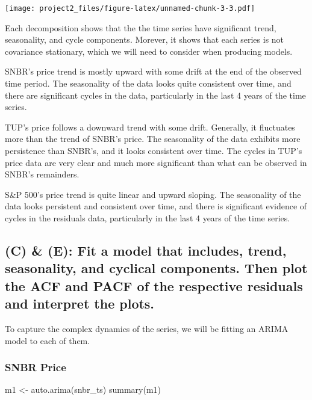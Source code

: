 \documentclass[
  10.5pt,
]{article}
\newenvironment{Shaded}{\begin{snugshade}}{\end{snugshade}}
\newcommand{\FunctionTok}[1]{\textcolor[rgb]{0.00,0.00,0.00}{#1}}
\newcommand{\NormalTok}[1]{#1}
\newcommand{\OtherTok}[1]{\textcolor[rgb]{0.56,0.35,0.01}{#1}}
\begin{document}
\texttt{[image: project2\_files/figure-latex/unnamed-chunk-3-3.pdf]}

Each decomposition shows that the the time series have significant
trend, seasonality, and cycle components. Morever, it shows that each
series is not covariance stationary, which we will need to consider when
producing models.

SNBR's price trend is mostly upward with some drift at the end of the
observed time period. The seasonality of the data looks quite consistent
over time, and there are significant cycles in the data, particularly in
the last 4 years of the time series.

TUP's price follows a downward trend with some drift. Generally, it
fluctuates more than the trend of SNBR's price. The seasonality of the
data exhibits more persistence than SNBR's, and it looks consistent over
time. The cycles in TUP's price data are very clear and much more
significant than what can be observed in SNBR's remainders.

S\&P 500's price trend is quite linear and upward sloping. The
seasonality of the data looks persistent and consistent over time, and
there is significant evidence of cycles in the residuals data,
particularly in the last 4 years of the time series.

\hypertarget{c-e-fit-a-model-that-includes-trend-seasonality-and-cyclical-components.-then-plot-the-acf-and-pacf-of-the-respective-residuals-and-interpret-the-plots.}{%
\subsection{(C) \& (E): Fit a model that includes, trend, seasonality,
and cyclical components. Then plot the ACF and PACF of the respective
residuals and interpret the
plots.}\label{c-e-fit-a-model-that-includes-trend-seasonality-and-cyclical-components.-then-plot-the-acf-and-pacf-of-the-respective-residuals-and-interpret-the-plots.}}

To capture the complex dynamics of the series, we will be fitting an
ARIMA model to each of them.

\hypertarget{snbr-price}{%
\subsubsection{SNBR Price}\label{snbr-price}}

\begin{Shaded}
\begin{Highlighting}[]
\NormalTok{m1 }\OtherTok{\textless{}{-}} \FunctionTok{auto.arima}\NormalTok{(snbr\_ts)}
\FunctionTok{summary}\NormalTok{(m1)}
\end{Highlighting}
\end{Shaded}
\end{document}
